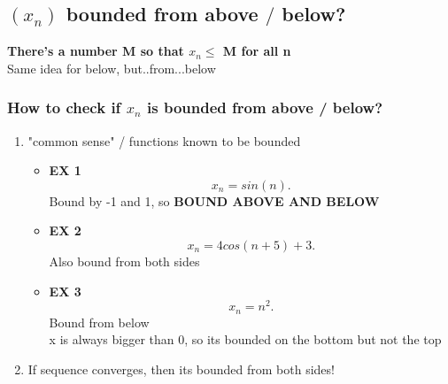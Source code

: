 \documentclass[]{report}
\begin{document}
\subsection*{$(x_n)$ bounded from above $/$ below?}
          \noindent{} \textbf{There's a number M so that $x_n \leq$ M for all n}
          \\
          Same idea for below, but..from...below 

          \subsubsection*{How to check if $x_n$ is bounded from above / below? } 
          \begin{enumerate}
                  \item "common sense" / functions known to be bounded 
                          \begin{itemize}
                                  \item \textbf{EX 1}
                                          \\
                                          \[
                                                  x_n = sin(n)
                                          .\] Bound by -1 and 1, so \textbf{BOUND ABOVE AND BELOW} 

                                  \item \textbf{EX 2} 
                                          \\
                                          \[
                                                  x_n = 4 cos(n+5) + 3
                                          .\] Also bound from both sides 

                                          \item \textbf{EX 3}
                                          \\
                                          \[
                                          x_n = n^{2}
                                          .\] Bound from below 
                                          \\ x is always bigger than 0, so its bounded on the bottom but not the top 
                          \end{itemize}
                          \item If sequence converges, then its bounded from both sides! 
                          
          \end{enumerate}
          \noindent{}
\end{document}
